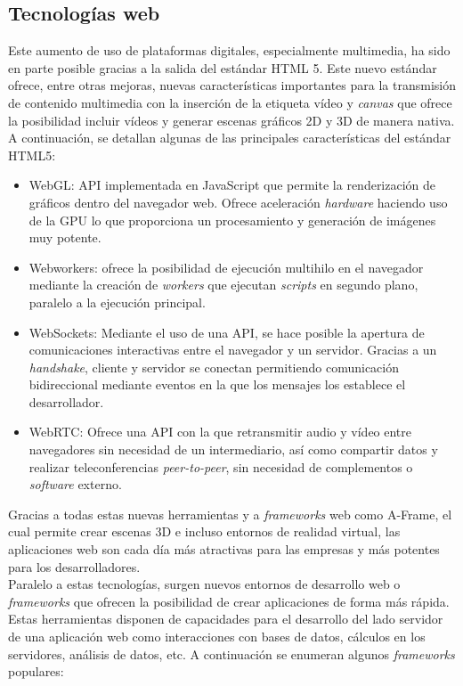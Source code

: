 \documentclass[a4paper, 12pt]{book}
\begin{document}
	
	\subsection{Tecnologías web}
	\label{subsec:introduccion_tecnologias_web}	
		
		Este aumento de uso de plataformas digitales, especialmente multimedia, ha sido en parte posible gracias a la salida del estándar HTML 5. Este nuevo estándar ofrece, entre otras mejoras, nuevas características importantes para la transmisión de contenido multimedia con la inserción de la etiqueta vídeo y \textit{canvas} que ofrece la posibilidad incluir vídeos y generar escenas gráficos 2D y 3D de manera nativa. A continuación, se detallan algunas de las principales características del estándar HTML5:
		
		\begin{itemize}
			\item WebGL: API implementada en JavaScript que permite la renderización de gráficos dentro del navegador web. Ofrece aceleración \textit{hardware} haciendo uso de la GPU lo que proporciona un procesamiento y generación de imágenes muy potente.
			\item Webworkers: ofrece la posibilidad de ejecución multihilo en el navegador mediante la creación de \textit{workers} que ejecutan \textit{scripts} en segundo plano, paralelo a la ejecución principal.
			\item WebSockets: Mediante el uso de una API, se hace posible la apertura de comunicaciones interactivas entre el navegador y un servidor. Gracias a un \textit{handshake}, cliente y servidor se conectan permitiendo comunicación bidireccional mediante eventos en la que los mensajes los establece el desarrollador.
			\item WebRTC: Ofrece una API con la que retransmitir audio y vídeo entre navegadores sin necesidad de un intermediario, así como compartir datos y realizar teleconferencias \textit{peer-to-peer}, sin necesidad de complementos o \textit{software} externo.
		\end{itemize}
			
		Gracias a todas estas nuevas herramientas y a \textit{frameworks} web como A-Frame, el cual permite crear escenas 3D e incluso entornos de realidad virtual, las aplicaciones web son cada día más atractivas para las empresas y más potentes para los desarrolladores. \\
		
		Paralelo a estas tecnologías, surgen nuevos entornos de desarrollo web o \textit{frameworks} que ofrecen la posibilidad de crear aplicaciones de forma más rápida. Estas herramientas disponen de capacidades para el desarrollo del lado servidor de una aplicación web como interacciones con bases de datos, cálculos en los servidores, análisis de datos, etc. A continuación se enumeran algunos \textit{frameworks} populares:
		
\end{document}
